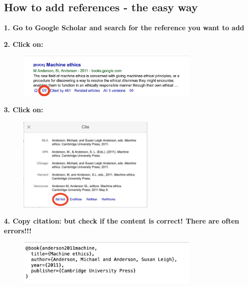 \subsection{How to add references - the easy way}

\textbf{1. Go to Google Scholar and search for the reference you want to add}

\textbf{2. Click on:}
\begin{figure}[H]
	\centering
  \includegraphics[width=0.8\textwidth]{figures/step1.png}
	\caption{}
\end{figure} 

\textbf{3. Click on:}

\begin{figure}[H]
	\centering
  \includegraphics[width=0.6\textwidth]{figures/step2.png}
	\caption{}
\end{figure} 

\textbf{4. Copy citation: but check if the content is correct! There are often errors!!!}
\begin{figure}[H]
	\centering
  \includegraphics[width=0.8\textwidth]{figures/step3.png}
	\caption{}
\end{figure} 








